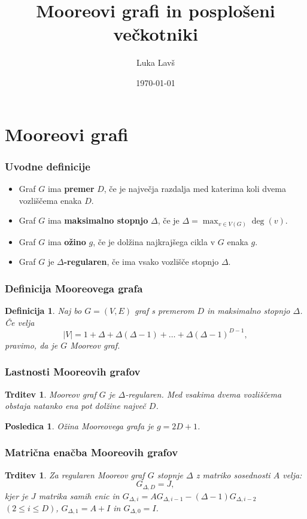 \documentclass{beamer}
\title{Mooreovi grafi in posplošeni večkotniki}
\author{Luka Lavš}
\date{\today}
\newtheorem{trditev}[izrek]{Trditev}
\newtheorem{posledica}[izrek]{Posledica}
\newtheorem{definicija}[izrek]{Definicija}
\begin{document}
\begin{frame}
    \titlepage
\end{frame}

\section{Mooreovi grafi}

\begin{frame}
    \frametitle{Uvodne definicije}
    \begin{itemize}
        \item[\textbullet] Graf $G$ ima \textbf{premer} $D$, če je največja razdalja med  
        katerima koli dvema vozliščema enaka $D$.
        \item[\textbullet] Graf $G$ ima \textbf{maksimalno stopnjo} $\Delta$, če je
        $\Delta = \max_{v \in V(G)} \deg(v)$.
        \item[\textbullet] Graf $G$ ima \textbf{ožino} $g$, če je dolžina 
        najkrajšega cikla v $G$ enaka $g$.
        \item[\textbullet] Graf $G$ je \textbf{$\Delta$-regularen}, če ima vsako 
        vozlišče stopnjo $\Delta$.
    \end{itemize}
\end{frame}

\begin{frame}
\frametitle{Definicija Mooreovega grafa}
\begin{definicija}
Naj bo $G=(V,E)$ graf s premerom $D$ in maksimalno stopnjo $\Delta$.  
Če velja
\[
|V| = 1 + \Delta + \Delta(\Delta-1) + \dots + \Delta(\Delta-1)^{D-1},
\]
pravimo, da je $G$ \emph{Mooreov graf}.
\end{definicija}
\end{frame}

\begin{frame}
\frametitle{Lastnosti Mooreovih grafov}
\begin{trditev}
Mooreov graf $G$ je $\Delta$-regularen. Med vsakima dvema vozliščema obstaja natanko ena pot dolžine največ $D$.
\end{trditev}

\begin{posledica}
Ožina Mooreovega grafa je $g = 2D + 1$.
\end{posledica}
\end{frame}


\begin{frame}
    \frametitle{Matrična enačba Mooreovih grafov}
    \begin{trditev}
    Za regularen Mooreov graf $G$ stopnje $\Delta$ z matriko
    sosednosti $A$ velja:
\[G_{\Delta, D} = J,\]    
kjer je $J$ matrika samih enic in 
$G_{\Delta, i} = A G_{\Delta, i-1} -
(\Delta - 1) G_{\Delta, i-2}$ $(2 \le i \le D)$,
$G_{\Delta, 1} = A + I$ in $G_{\Delta, 0} = I$.
    \end{trditev}
\end{frame}
\end{document}
